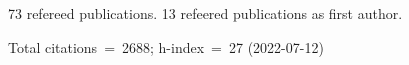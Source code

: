 73 refereed publications. 13 refeered publications as first author.

Total citations~=~2688; h-index~=~27 (2022-07-12)